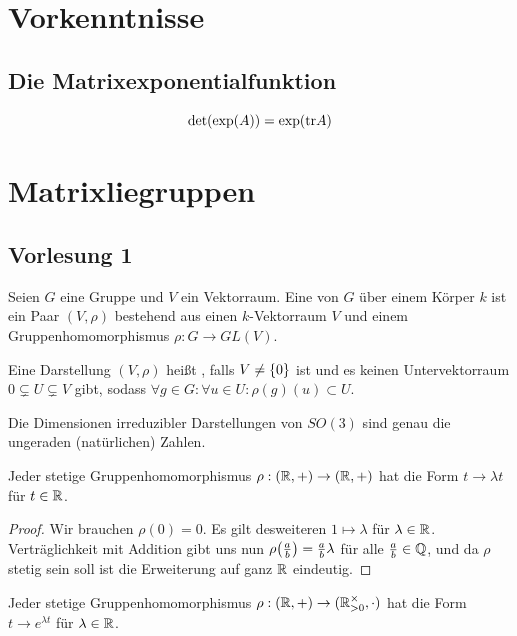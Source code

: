 \documentclass{report}
\begin{document}

\tableofcontents
\chapter{Vorkenntnisse}
\section{Die Matrixexponentialfunktion}
\begin{theorem}
	$$\det(\exp(A)) = \exp(\textnormal{tr} A)$$
\end{theorem}
\chapter{Matrixliegruppen}
\section{Vorlesung 1}
\begin{definition}
	Seien $G$ eine Gruppe und $V$ ein Vektorraum. Eine  von $G$ über einem Körper $k$ ist ein Paar $(V,\rho)$ bestehend aus einen $k$-Vektorraum $V$ und einem Gruppenhomomorphismus $\rho : G \to GL(V)$.
\end{definition}
\begin{definition}
	Eine Darstellung $(V, \rho)$ heißt , falls $V \neq \qty{0}$ ist und es keinen Untervektorraum $0 \subsetneq U \subsetneq V$ gibt, sodass $\forall g \in G : \forall u \in U : \rho(g)(u) \subset U$.
\end{definition}
\begin{proposition}
	Die Dimensionen irreduzibler Darstellungen von $SO(3)$ sind genau die ungeraden (natürlichen) Zahlen.
\end{proposition}
\begin{theorem}
	Jeder stetige Gruppenhomomorphismus $\rho : (\mathbb{R}, +) \to (\mathbb{R}, +)$ hat die Form $t \to \lambda t$ für $t \in \mathbb{R}$.
\end{theorem}
\begin{proof}
	Wir brauchen $\rho(0) = 0$. Es gilt desweiteren $1 \mapsto \lambda$ für $\lambda \in \mathbb{R}$. Verträglichkeit mit Addition gibt uns nun $\rho\qty(\frac{a}{b}) = \frac{a}{b}\lambda$ für alle $\frac{a}{b} \in \mathbb{Q}$, und da $\rho$ stetig sein soll ist die Erweiterung auf ganz $\mathbb{R}$ eindeutig.
\end{proof}
\begin{corollary}
	Jeder stetige Gruppenhomomorphismus $\rho : (\mathbb{R}, +) \to (\mathbb{R}^\times_{> 0}, \cdot)$ hat die Form $t \to e^{\lambda t}$ für $\lambda \in \mathbb{R}$.
\end{corollary}
\end{document}
